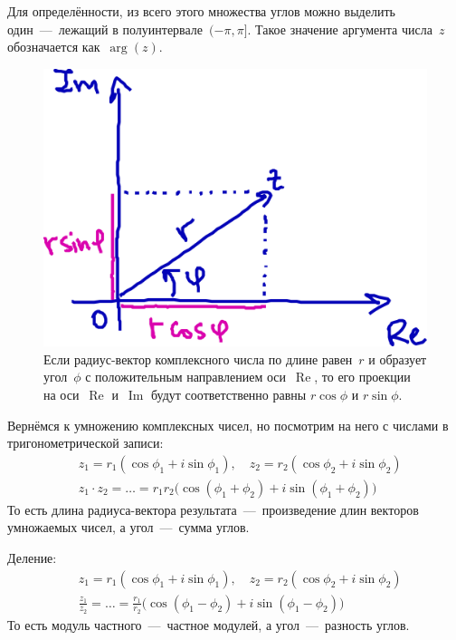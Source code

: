 \documentclass[a4paper,12pt]{article}
\DeclareMathOperator{\Real}{Re}
\DeclareMathOperator{\Imag}{Im}
\begin{document}
  Для определённости, из всего этого множества углов можно выделить один~---~лежащий в полуинтервале~$(-\pi, \pi]$.
  Такое значение аргумента числа~$z$ обозначается как~$\arg(z)$.

  \begin{figure}[ht]
    \centering
    \includegraphics[width=0.6\linewidth]{images/z-projection}
    
    \caption{
      Если радиус-вектор комплексного числа по длине равен~$r$ и образует угол~$\phi$ с положительным направлением оси~$\Real$, то его проекции на оси~$\Real$ и~$\Imag$ будут соответственно равны $r \cos \phi$ и $r \sin \phi$.
    }
    \label{fig:z-projection}
  \end{figure}

  Вернёмся к умножению комплексных чисел, но посмотрим на него с числами в тригонометрической записи:
  \begin{equation}\label{eq:c-mul}
    \begin{aligned}
      &z_1 = r_1(\cos \phi_1 + i \sin\phi_1),\quad z_2 = r_2(\cos \phi_2 + i \sin\phi_2)\\
      &z_1 \cdot z_2 = \ldots = r_1 r_2 \bigl(\cos (\phi_1 + \phi_2) + i\sin (\phi_1 + \phi_2)\bigr)
    \end{aligned}
  \end{equation}
  То есть длина радиуса-вектора результата~---~произведение длин векторов умножаемых чисел, а угол~---~сумма углов.

  Деление:
  \[
    \begin{aligned}
      &z_1 = r_1(\cos \phi_1 + i \sin\phi_1),\quad z_2 = r_2(\cos \phi_2 + i \sin\phi_2)\\
      &\frac{z_1}{z_2} = \ldots = \frac{r_1}{r_2} \bigl(\cos (\phi_1 - \phi_2) + i\sin (\phi_1 - \phi_2)\bigr)
    \end{aligned}
  \]
  То есть модуль частного~---~частное модулей, а угол~---~разность углов.
\end{document}
